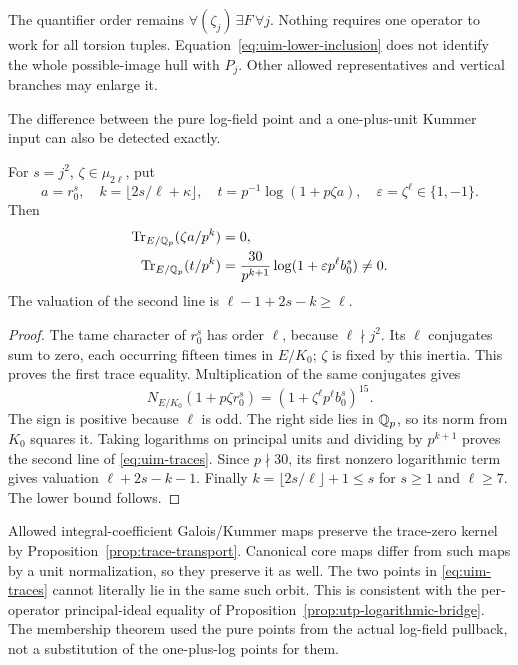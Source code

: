The quantifier order remains
\(\forall(\zeta_j)\,\exists F\,\forall j\).
Nothing requires one operator
to work for all torsion tuples.
Equation~\eqref{eq:uim-lower-inclusion}
does not identify the whole
possible-image hull with \(P_j\).
Other allowed representatives
and vertical branches may
enlarge it.

The difference between the
pure log-field point and a
one-plus-unit Kummer input
can also be detected exactly.

\begin{lemma}
\label{lem:uim-trace-separation}
For \(s=j^2\), \(\zeta\in\mu_{2\ell}\), put
\[
 a=r_0^s,\quad
 k=\lfloor2s/\ell+\kappa\rfloor,\quad
 t=p^{-1}\log(1+p\zeta a),\quad
 \varepsilon=\zeta^\ell\in\{1,-1\}.
\]
Then
\begin{equation}\label{eq:uim-traces}
 \begin{aligned}
 \operatorname{Tr}_{E/\mathbb Q_p}(\zeta a/p^k)&=0,\\
 \operatorname{Tr}_{E/\mathbb Q_p}(t/p^k)
     &=\frac{30}{p^{k+1}}
             \log(1+\varepsilon p^\ell b_0^s)\ne0.
 \end{aligned}
\end{equation}
The valuation of the second line is
\(\ell-1+2s-k\ge\ell\).
\end{lemma}
\begin{proof}
The tame character of \(r_0^s\)
has order \(\ell\), because
\(\ell\nmid j^2\).
Its \(\ell\) conjugates sum
to zero, each occurring
fifteen times in \(E/K_0\);
\(\zeta\) is fixed by this
inertia. This proves the
first trace equality.
Multiplication of the same
conjugates gives
\[
 N_{E/K_0}(1+p\zeta r_0^s)
          =(1+\zeta^\ell p^\ell b_0^s)^{15}.
\]
The sign is positive because
\(\ell\) is odd. The right
side lies in \(\mathbb Q_p\),
so its norm from \(K_0\)
squares it. Taking logarithms
on principal units and
dividing by \(p^{k+1}\)
proves the second line of
\eqref{eq:uim-traces}.
Since \(p\nmid30\), its
first nonzero logarithmic
term gives valuation
\(\ell+2s-k-1\).
Finally \(k=\lfloor2s/\ell\rfloor+1\le s\)
for \(s\ge1\) and \(\ell\ge7\).
The lower bound follows.
\end{proof}

Allowed integral-coefficient
Galois/Kummer maps preserve
the trace-zero kernel by
Proposition~\ref{prop:trace-transport}.
Canonical core maps differ
from such maps by a unit
normalization, so they
preserve it as well.
The two points in
\eqref{eq:uim-traces} cannot
literally lie in the same
such orbit. This is consistent
with the per-operator
principal-ideal equality of
Proposition~\ref{prop:utp-logarithmic-bridge}.
The membership theorem used
the pure points from the
actual log-field pullback,
not a substitution of the
one-plus-log points for them.

